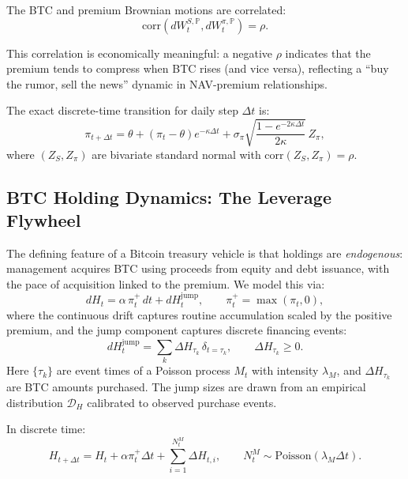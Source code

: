 The BTC and premium Brownian motions are correlated:
\begin{equation}
    \text{corr}(dW_t^{S,\mathbb{P}}, dW_t^{\pi,\mathbb{P}}) = \rho.
\end{equation}

This correlation is economically meaningful: a negative $\rho$ indicates that the premium tends to compress when BTC rises (and vice versa), reflecting a ``buy the rumor, sell the news'' dynamic in NAV-premium relationships.

The exact discrete-time transition for daily step $\Delta t$ is:
\begin{equation}
    \pi_{t+\Delta t} = \theta + (\pi_t - \theta) e^{-\kappa \Delta t} + \sigma_\pi \sqrt{\frac{1 - e^{-2\kappa \Delta t}}{2\kappa}}\, Z_\pi,
\end{equation}
where $(Z_S, Z_\pi)$ are bivariate standard normal with $\text{corr}(Z_S, Z_\pi) = \rho$.

\subsection{BTC Holding Dynamics: The Leverage Flywheel}

The defining feature of a Bitcoin treasury vehicle is that holdings are \emph{endogenous}: management acquires BTC using proceeds from equity and debt issuance, with the pace of acquisition linked to the premium. We model this via:
\begin{equation}
    dH_t = \alpha\, \pi_t^+\, dt + dH_t^{\text{jump}}, \qquad \pi_t^+ = \max(\pi_t, 0),
\end{equation}
where the continuous drift captures routine accumulation scaled by the positive premium, and the jump component captures discrete financing events:
\begin{equation}
    dH_t^{\text{jump}} = \sum_k \Delta H_{\tau_k}\, \delta_{t = \tau_k}, \qquad \Delta H_{\tau_k} \ge 0.
\end{equation}
Here $\{\tau_k\}$ are event times of a Poisson process $M_t$ with intensity $\lambda_M$, and $\Delta H_{\tau_k}$ are BTC amounts purchased. The jump sizes are drawn from an empirical distribution $\mathcal{D}_H$ calibrated to observed purchase events.

In discrete time:
\begin{equation}
    H_{t+\Delta t} = H_t + \alpha \pi_t^+ \Delta t + \sum_{i=1}^{N_t^M} \Delta H_{t,i}, \qquad N_t^M \sim \text{Poisson}(\lambda_M \Delta t).
\end{equation}

